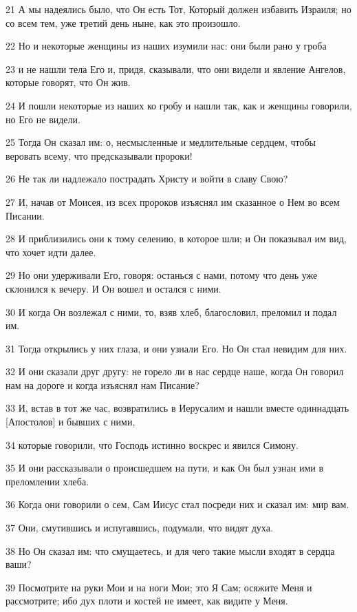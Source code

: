 \par 21 А мы надеялись было, что Он есть Тот, Который должен избавить Израиля; но со всем тем, уже третий день ныне, как это произошло.
\par 22 Но и некоторые женщины из наших изумили нас: они были рано у гроба
\par 23 и не нашли тела Его и, придя, сказывали, что они видели и явление Ангелов, которые говорят, что Он жив.
\par 24 И пошли некоторые из наших ко гробу и нашли так, как и женщины говорили, но Его не видели.
\par 25 Тогда Он сказал им: о, несмысленные и медлительные сердцем, чтобы веровать всему, что предсказывали пророки!
\par 26 Не так ли надлежало пострадать Христу и войти в славу Свою?
\par 27 И, начав от Моисея, из всех пророков изъяснял им сказанное о Нем во всем Писании.
\par 28 И приблизились они к тому селению, в которое шли; и Он показывал им вид, что хочет идти далее.
\par 29 Но они удерживали Его, говоря: останься с нами, потому что день уже склонился к вечеру. И Он вошел и остался с ними.
\par 30 И когда Он возлежал с ними, то, взяв хлеб, благословил, преломил и подал им.
\par 31 Тогда открылись у них глаза, и они узнали Его. Но Он стал невидим для них.
\par 32 И они сказали друг другу: не горело ли в нас сердце наше, когда Он говорил нам на дороге и когда изъяснял нам Писание?
\par 33 И, встав в тот же час, возвратились в Иерусалим и нашли вместе одиннадцать [Апостолов] и бывших с ними,
\par 34 которые говорили, что Господь истинно воскрес и явился Симону.
\par 35 И они рассказывали о происшедшем на пути, и как Он был узнан ими в преломлении хлеба.
\par 36 Когда они говорили о сем, Сам Иисус стал посреди них и сказал им: мир вам.
\par 37 Они, смутившись и испугавшись, подумали, что видят духа.
\par 38 Но Он сказал им: что смущаетесь, и для чего такие мысли входят в сердца ваши?
\par 39 Посмотрите на руки Мои и на ноги Мои; это Я Сам; осяжите Меня и рассмотрите; ибо дух плоти и костей не имеет, как видите у Меня.

